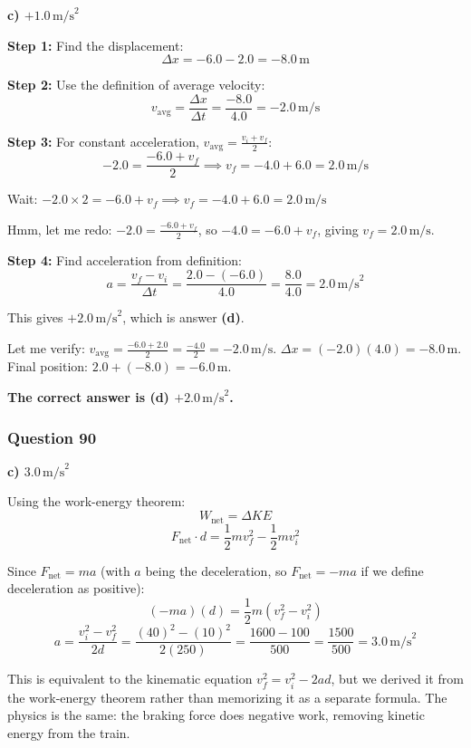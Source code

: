 \documentclass[12pt,letterpaper]{article}
\begin{document}
\begin{answerbox}
\textbf{c) $+1.0\,\text{m/s}^2$}
\end{answerbox}

\begin{explanationbox}
\textbf{Step 1:} Find the displacement:
\[
\Delta x = -6.0 - 2.0 = -8.0\,\text{m}
\]

\textbf{Step 2:} Use the definition of average velocity:
\[
v_{\text{avg}} = \frac{\Delta x}{\Delta t} = \frac{-8.0}{4.0} = -2.0\,\text{m/s}
\]

\textbf{Step 3:} For constant acceleration, $v_{\text{avg}} = \frac{v_i + v_f}{2}$:
\[
-2.0 = \frac{-6.0 + v_f}{2} \implies v_f = -4.0 + 6.0 = 2.0\,\text{m/s}
\]

Wait: $-2.0 \times 2 = -6.0 + v_f \implies v_f = -4.0 + 6.0 = 2.0\,\text{m/s}$

Hmm, let me redo: $-2.0 = \frac{-6.0 + v_f}{2}$, so $-4.0 = -6.0 + v_f$, giving $v_f = 2.0\,\text{m/s}$.

\textbf{Step 4:} Find acceleration from definition:
\[
a = \frac{v_f - v_i}{\Delta t} = \frac{2.0 - (-6.0)}{4.0} = \frac{8.0}{4.0} = 2.0\,\text{m/s}^2
\]

This gives $+2.0\,\text{m/s}^2$, which is answer \textbf{(d)}.

Let me verify: $v_{\text{avg}} = \frac{-6.0 + 2.0}{2} = \frac{-4.0}{2} = -2.0\,\text{m/s}$. $\Delta x = (-2.0)(4.0) = -8.0\,\text{m}$. Final position: $2.0 + (-8.0) = -6.0\,\text{m}$. \checkmark

\textbf{The correct answer is (d) $+2.0\,\text{m/s}^2$.}
\end{explanationbox}

\subsubsection*{Question 90}

\begin{answerbox}
\textbf{c) $3.0\,\text{m/s}^2$}
\end{answerbox}

\begin{explanationbox}
Using the work-energy theorem:
\[
W_{\text{net}} = \Delta KE
\]
\[
F_{\text{net}} \cdot d = \frac{1}{2}mv_f^2 - \frac{1}{2}mv_i^2
\]

Since $F_{\text{net}} = ma$ (with $a$ being the deceleration, so $F_{\text{net}} = -ma$ if we define deceleration as positive):
\[
(-ma)(d) = \frac{1}{2}m(v_f^2 - v_i^2)
\]
\[
a = \frac{v_i^2 - v_f^2}{2d} = \frac{(40)^2 - (10)^2}{2(250)} = \frac{1600 - 100}{500} = \frac{1500}{500} = 3.0\,\text{m/s}^2
\]

This is equivalent to the kinematic equation $v_f^2 = v_i^2 - 2ad$, but we derived it from the work-energy theorem rather than memorizing it as a separate formula. The physics is the same: the braking force does negative work, removing kinetic energy from the train.
\end{explanationbox}
\end{document}
